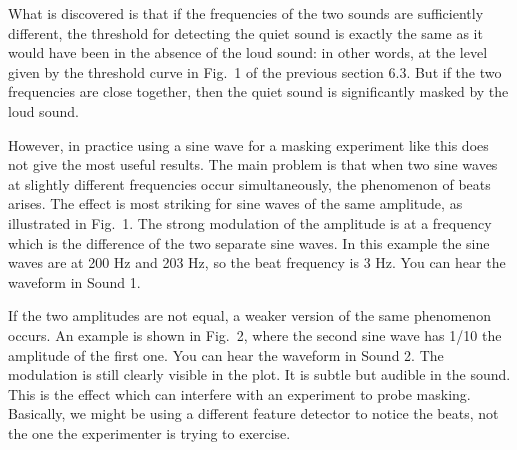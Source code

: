   What is discovered is that if the frequencies of the two sounds are 
  sufficiently different, the threshold for detecting the quiet sound is 
  exactly the same as it would have been in the absence of the loud sound: in 
  other words, at the level given by the threshold curve in Fig.\ 1 of the 
  previous section 6.3. But if the two frequencies are close together, then the 
  quiet sound is significantly masked by the loud sound. 

  However, in practice using a sine wave for a masking experiment like this 
  does not give the most useful results. The main problem is that when two sine 
  waves at slightly different frequencies occur simultaneously, the phenomenon 
  of beats arises. The effect is most striking for sine waves of the same 
  amplitude, as illustrated in Fig.\ 1. The strong modulation of the amplitude 
  is at a frequency which is the difference of the two separate sine waves. In 
  this example the sine waves are at 200 Hz and 203 Hz, so the beat frequency 
  is 3 Hz. You can hear the waveform in Sound 1. 



  If the two amplitudes are not equal, a weaker version of the same phenomenon 
  occurs. An example is shown in Fig.\ 2, where the second sine wave has 1/10 
  the amplitude of the first one. You can hear the waveform in Sound 2. The 
  modulation is still clearly visible in the plot. It is subtle but audible in 
  the sound. This is the effect which can interfere with an experiment to probe 
  masking. Basically, we might be using a different feature detector to notice 
  the beats, not the one the experimenter is trying to exercise. 


